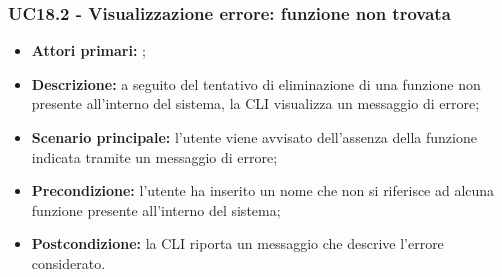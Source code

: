 \subsubsection{UC18.2 - Visualizzazione errore: funzione non trovata}
\begin{itemize}
	\item \textbf{Attori primari:} \us{};
	\item \textbf{Descrizione:} a seguito del tentativo di eliminazione di una funzione non presente all’interno del sistema, la CLI visualizza un messaggio di errore;  
	\item \textbf{Scenario principale:} l’utente viene avvisato dell’assenza della funzione indicata tramite un messaggio di errore;
	\item \textbf{Precondizione:} l’utente ha inserito un nome che non si riferisce ad alcuna funzione presente all’interno del sistema;
	\item \textbf{Postcondizione:} la CLI riporta un messaggio che descrive l’errore considerato.
\end{itemize}